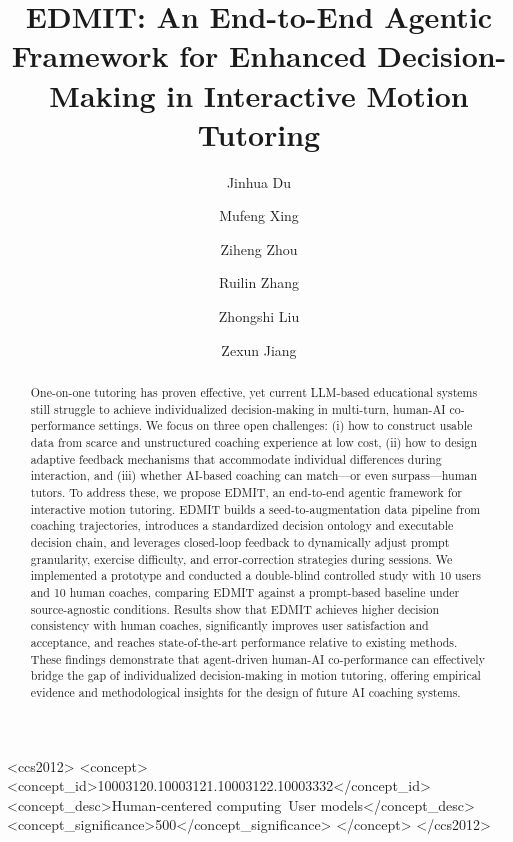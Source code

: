 \documentclass[sigconf]{acmart}
\begin{document}
\title{EDMIT: An End-to-End Agentic Framework for Enhanced Decision-Making in Interactive Motion Tutoring}

\author{Jinhua Du}


\author{Mufeng Xing}
\author{Ziheng Zhou}
\author{Ruilin Zhang}
\author{Zhongshi Liu}

\author{Zexun Jiang}

\begin{abstract}
One-on-one tutoring has proven effective, yet current LLM-based educational systems still struggle to achieve individualized decision-making in multi-turn, human-AI co-performance settings. We focus on three open challenges: (i) how to construct usable data from scarce and unstructured coaching experience at low cost, (ii) how to design adaptive feedback mechanisms that accommodate individual differences during interaction, and (iii) whether AI-based coaching can match—or even surpass—human tutors. To address these, we propose EDMIT, an end-to-end agentic framework for interactive motion tutoring. EDMIT builds a seed-to-augmentation data pipeline from coaching trajectories, introduces a standardized decision ontology and executable decision chain, and leverages closed-loop feedback to dynamically adjust prompt granularity, exercise difficulty, and error-correction strategies during sessions. We implemented a prototype and conducted a double-blind controlled study with 10 users and 10 human coaches, comparing EDMIT against a prompt-based baseline under source-agnostic conditions. Results show that EDMIT achieves higher decision consistency with human coaches, significantly improves user satisfaction and acceptance, and reaches state-of-the-art performance relative to existing methods. These findings demonstrate that agent-driven human-AI co-performance can effectively bridge the gap of individualized decision-making in motion tutoring, offering empirical evidence and methodological insights for the design of future AI coaching systems.
\end{abstract}

\begin{CCSXML}
  <ccs2012>
  <concept>
  <concept_id>10003120.10003121.10003122.10003332</concept_id>
  <concept_desc>Human-centered computing~User models</concept_desc>
  <concept_significance>500</concept_significance>
  </concept>
  </ccs2012>
\end{CCSXML}
\end{document}
